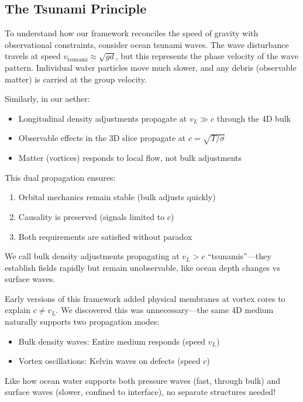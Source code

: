 \subsection{The Tsunami Principle}

To understand how our framework reconciles the speed of gravity with observational constraints, consider ocean tsunami waves. The wave disturbance travels at speed $v_{\text{tsunami}} \approx \sqrt{g d}$, but this represents the phase velocity of the wave pattern. Individual water particles move much slower, and any debris (observable matter) is carried at the group velocity.

Similarly, in our aether:
\begin{itemize}
\item Longitudinal density adjustments propagate at $v_L \gg c$ through the 4D bulk
\item Observable effects in the 3D slice propagate at $c = \sqrt{T / \sigma}$
\item Matter (vortices) responds to local flow, not bulk adjustments
\end{itemize}

This dual propagation ensures:
\begin{enumerate}
\item Orbital mechanics remain stable (bulk adjusts quickly)
\item Causality is preserved (signals limited to $c$)
\item Both requirements are satisfied without paradox
\end{enumerate}

We call bulk density adjustments propagating at $v_L > c$ ``tsunamis''---they establish fields rapidly but remain unobservable, like ocean depth changes vs surface waves.

\begin{tcolorbox}[title=Why Two Speeds Without Membranes]
Early versions of this framework added physical membranes at vortex cores
to explain $c \neq v_L$. We discovered this was unnecessary---the same 4D medium
naturally supports two propagation modes:

\begin{itemize}
\item Bulk density waves: Entire medium responds (speed $v_L$)
\item Vortex oscillations: Kelvin waves on defects (speed $c$)
\end{itemize}

Like how ocean water supports both pressure waves (fast, through bulk)
and surface waves (slower, confined to interface), no separate structures
needed!
\end{tcolorbox}

